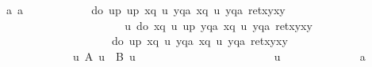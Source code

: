 \begin{isabellebody}
\ a{}\ a{}\isanewline
\ \ \ \ \ \ \ \ \isamarkupfalse%
\ {\isachardoublequote}{\isasymdots}\ {\isacharequal}\ do\ {\isacharbraceleft}u{\isasymleftarrow}p{\isacharsemicolon}\ u{\isacharprime}{\isasymleftarrow}p{\isacharsemicolon}\ x{\isasymleftarrow}q\ u{\isacharsemicolon}\ y{\isasymleftarrow}qa{\isacharsemicolon}\ x{\isacharprime}{\isasymleftarrow}q\ u{\isacharprime}{\isacharsemicolon}\ y{\isacharprime}{\isasymleftarrow}qa{\isacharsemicolon}\ ret{\isacharparenleft}{\isacharparenleft}x{\isacharcomma}y{\isacharparenright}{\isacharcomma}{\isacharparenleft}x{\isacharprime}{\isacharcomma}y{\isacharprime}{\isacharparenright}{\isacharparenright}{\isacharbraceright}{\isachardoublequote}\isanewline
\ \ \ \ \ \ \ \ \isamarkupfalse%
\ {\isacharminus}\ \isanewline
\ \ \ \ \ \ \ \ \ \ %
\isanewline
\ \ \ \ \ \ \ \ \ \ \isamarkupfalse%
\ {\isachardoublequote}{\isasymforall}u{\isachardot}\ do\ {\isacharbraceleft}x{\isasymleftarrow}q\ u{\isacharsemicolon}\ u{\isacharprime}{\isasymleftarrow}p{\isacharsemicolon}\ y{\isasymleftarrow}qa{\isacharsemicolon}\ x{\isacharprime}{\isasymleftarrow}q\ u{\isacharprime}{\isacharsemicolon}\ y{\isacharprime}{\isasymleftarrow}qa{\isacharsemicolon}\ ret{\isacharparenleft}{\isacharparenleft}x{\isacharcomma}y{\isacharparenright}{\isacharcomma}{\isacharparenleft}x{\isacharprime}{\isacharcomma}y{\isacharprime}{\isacharparenright}{\isacharparenright}{\isacharbraceright}\ {\isacharequal}\isanewline
\ \ \ \ \ \ \ \ \ \ \ \ \ \ \ \ \ \ \ \ do\ {\isacharbraceleft}u{\isacharprime}{\isasymleftarrow}p{\isacharsemicolon}\ x{\isasymleftarrow}q\ u{\isacharsemicolon}\ y{\isasymleftarrow}qa{\isacharsemicolon}\ x{\isacharprime}{\isasymleftarrow}q\ u{\isacharprime}{\isacharsemicolon}\ y{\isacharprime}{\isasymleftarrow}qa{\isacharsemicolon}\ ret{\isacharparenleft}{\isacharparenleft}x{\isacharcomma}y{\isacharparenright}{\isacharcomma}{\isacharparenleft}x{\isacharprime}{\isacharcomma}y{\isacharprime}{\isacharparenright}{\isacharparenright}{\isacharbraceright}{\isachardoublequote}\isanewline
\ \ \ \ \ \ \ \ \ \ \ \ {\isacharparenleft}\ {\isachardoublequote}{\isasymforall}u{\isachardot}\ {\isacharquery}A\ u\ {\isacharequal}\ {\isacharquery}B\ u{\isachardoublequote}{\isacharparenright}\isanewline
\ \ \ \ \ \ \ \ \ \ \isamarkupfalse%
\isanewline
\ \ \ \ \ \ \ \ \ \ \ \ \isamarkupfalse%
\ u\isanewline
\ \ \ \ \ \ \ \ \ \ \ \ \isamarkupfalse%
\ a{}\ \isamarkupfalse%

\end{isabellebody}
